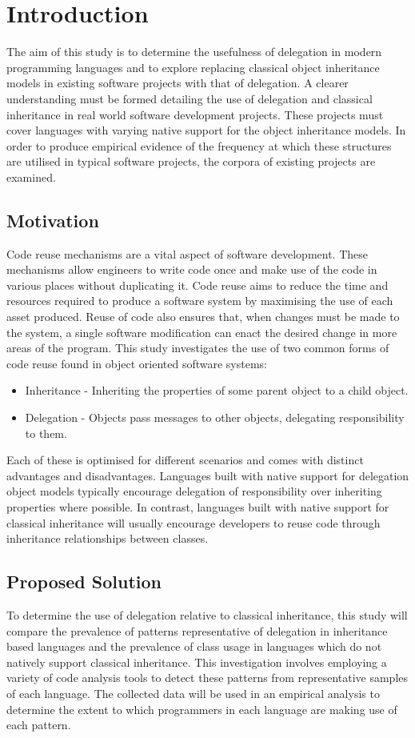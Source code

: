 \chapter{Introduction}\label{C:intro}
The aim of this study is to determine the usefulness of delegation in modern programming languages and to explore replacing classical object inheritance models in existing software projects with that of delegation. A clearer understanding must be formed detailing the use of delegation and classical inheritance in real world software development projects. These projects must cover languages with varying native support for the object inheritance models. In order to produce empirical evidence of the frequency at which these structures are utilised in typical software projects, the corpora of existing projects are examined.

\section{Motivation}
Code reuse mechanisms are a vital aspect of software development. These mechanisms allow engineers to write code once and make use of the code in various places without duplicating it. Code reuse aims to reduce the time and resources required to produce a software system by maximising the use of each asset produced. Reuse of code also ensures that, when changes must be made to the system, a single software modification can enact the desired change in more areas of the program.
\newline
This study investigates the use of two common forms of code reuse found in object oriented software systems:
\begin{itemize}
	\item Inheritance - Inheriting the properties of some parent object to a child object.
	\item Delegation - Objects pass messages to other objects, delegating responsibility to them.
\end{itemize}
Each of these is optimised for different scenarios and comes with distinct advantages and disadvantages. Languages built with native support for delegation object models typically encourage delegation of responsibility over inheriting properties where possible. In contrast, languages built with native support for classical inheritance will usually encourage developers to reuse code through inheritance relationships between classes.

\section{Proposed Solution}
To determine the use of delegation relative to classical inheritance, this study will compare the prevalence of patterns representative of delegation in inheritance based languages and the prevalence of class usage in languages which do not natively support classical inheritance. This investigation involves employing a variety of code analysis tools to detect these patterns from representative samples of each language. The collected data will be used in an empirical analysis to determine the extent to which programmers in each language are making use of each pattern.

